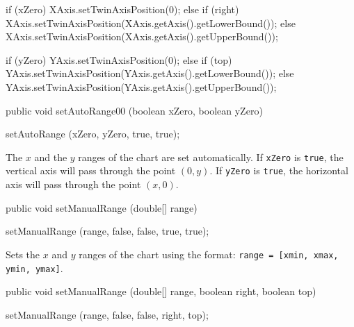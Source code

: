 \begin{code}
\begin{hide}
{      if (xZero)
         XAxis.setTwinAxisPosition(0);
      else {
         if (right)
            XAxis.setTwinAxisPosition(XAxis.getAxis().getLowerBound());
         else
            XAxis.setTwinAxisPosition(XAxis.getAxis().getUpperBound());
      }

      if (yZero)
         YAxis.setTwinAxisPosition(0);
      else {
         if (top)
            YAxis.setTwinAxisPosition(YAxis.getAxis().getLowerBound());
         else
            YAxis.setTwinAxisPosition(YAxis.getAxis().getUpperBound());
      }
   }\end{hide}

   public void setAutoRange00 (boolean xZero, boolean yZero) \begin{hide} {
      setAutoRange (xZero, yZero, true, true);
   }\end{hide}
\end{code}
\begin{tabb}
 The $x$ and the $y$ ranges of the chart are set automatically.
If \texttt{xZero} is \texttt{true}, the vertical axis will pass through the
point $(0, y)$. If \texttt{yZero} is \texttt{true}, the horizontal axis
will pass through the point $(x, 0)$.
\end{tabb}
\begin{htmlonly}
\end{htmlonly}
\begin{code}

   public void setManualRange (double[] range) \begin{hide} {
      setManualRange (range, false, false, true, true);
   }\end{hide}
\end{code}
\begin{tabb}
   Sets the $x$ and $y$ ranges of the chart  using the format: \texttt{range =
  [xmin, xmax, ymin, ymax]}. %
\end{tabb}
\begin{htmlonly}
\end{htmlonly}
\begin{code}

   public void setManualRange (double[] range, boolean right, boolean top) \begin{hide} {
      setManualRange (range, false, false, right, top);
   }\end{hide}
\end{code}
